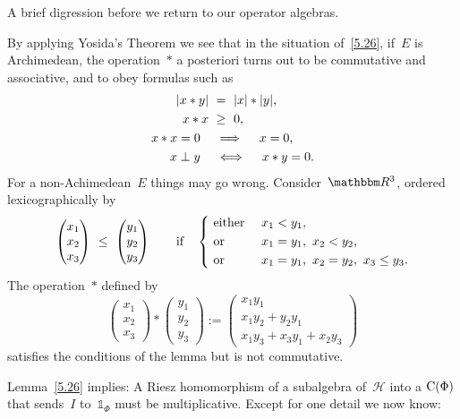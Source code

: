 \documentclass[main.tex]{subfiles}
\begin{document}
%
%
\begin{psec}{5.17}%
A brief digression before we return to our operator algebras.

By applying Yosida's Theorem we see that
in the situation of~\ref{5.26},
if~$E$ is Archimedean,
the operation~$*$ a posteriori
turns out to be commutative and associative,
and to obey formulas such as
\begin{alignat*}{2}
|x*y|\ &=\ |x|*|y|\htam{,} \\
x*x \ &\geq\ 0\htam{,} \\
x*x=0\quad&\implies\quad x=0\htam{,} \\
x\perp y\quad&\iff\quad x*y=0\htam{.}
\end{alignat*}
For a non-Achimedean~$E$
things may go wrong.
Consider~$\R^3$,
ordered lexicographically by
\begin{equation*}
\begin{pmatrix}x_1 \\ x_2 \\ x_3\end{pmatrix}
\ \leq\ 
\begin{pmatrix}y_1 \\ y_2 \\ y_3\end{pmatrix}
\qquad\htam{if}\quad
\left\{\ 
\begin{aligned}
&\htam{either }&&x_1<y_1\htam{,} \\
&\htam{or } &&x_1=y_1,\ x_2<y_2\htam{,} \\
&\htam{or } &&x_1=y_1,\ x_2=y_2,\ x_3\leq y_3\htam{.}
\end{aligned}
\right.
\end{equation*}
The operation~$*$ defined by
\begin{equation*}
\begin{pmatrix} x_1 \\ x_2 \\ x_3 \end{pmatrix}
* 
\begin{pmatrix} y_1 \\ y_2 \\ y_3 \end{pmatrix}
:= 
\left(
\begin{array}{l}
x_1 y_1 \\
x_1 y_2 + y_2 y_1 \\
x_1 y_3 + x_3 y_1 + x_2 y_3
\end{array}
\right)
\end{equation*}
satisfies the conditions of the lemma
but is not commutative.
\end{psec}
%
%
\noindent Lemma~\ref{5.26} implies:
A Riesz homomorphism of a subalgebra of~$\mathscr H$
into a $\mathrm{C}(\Phi)$
that sends~$I$ to~$\mathbb{1}_\Phi$ must be multiplicative.
Except for one detail we now know:
\end{document}
